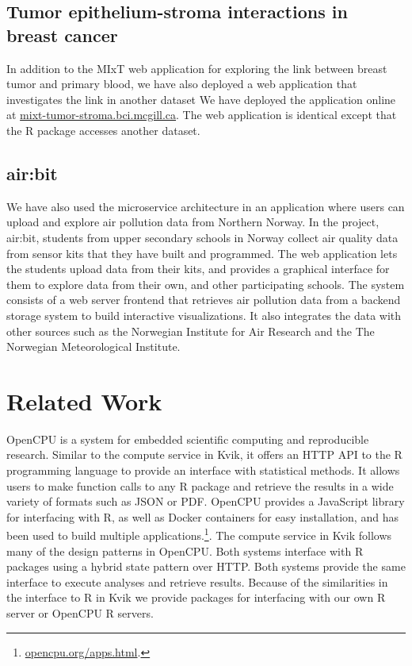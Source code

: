 \subsection{Tumor epithelium-stroma interactions in breast cancer}
In addition to the MIxT web application for exploring the link between breast
tumor and primary blood, we have also deployed a web application that
investigates the link in another dataset\cite{boersma2008stromal} We have
deployed the application online at \url{mixt-tumor-stroma.bci.mcgill.ca}. The
web application is identical except that the R package accesses another dataset. 

\subsection{air:bit}
We have also used the microservice architecture in an application where users
can upload and explore air pollution data from Northern
Norway.\cite{fjukstad2018low} In the project, air:bit, students from upper
secondary schools in Norway collect air quality data from sensor kits that they
have built and programmed. The web application lets the students upload data
from their kits, and provides a graphical interface for them to explore data
from their own, and other participating schools. The system consists of a web
server frontend that retrieves air pollution data from a backend storage system
to build interactive visualizations. It also integrates the data with other
sources such as the Norwegian Institute for Air Research and the The Norwegian
Meteorological Institute. 

    
\section{Related Work} 
OpenCPU is a system for embedded scientific computing and reproducible
research.\cite{opencpu} Similar to the compute service in Kvik, it offers an
HTTP API to the R programming language to provide an interface with statistical
methods. It allows users to make function calls to any R package and retrieve
the results in a wide variety of formats such as JSON or PDF. 
OpenCPU provides a JavaScript library for interfacing with R, as well as Docker
containers for easy installation, and has been used to build multiple
applications.\footnote{\url{opencpu.org/apps.html}.}. The compute service in
Kvik follows many of the design patterns in OpenCPU. Both systems interface with
R packages using a hybrid state pattern over HTTP. Both systems provide the same
interface to execute analyses and retrieve results.  Because of the similarities
in the interface to R in Kvik we provide packages for interfacing with our own R
server or OpenCPU R servers.

